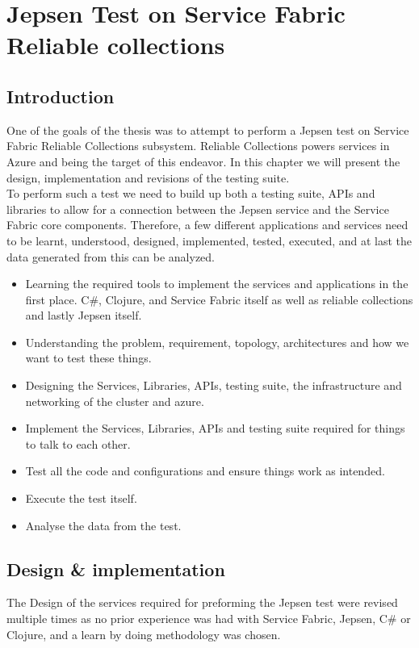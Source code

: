 \documentclass[a4paper,10pt,titlepage]{report}
\begin{document}
    \chapter{Jepsen Test on Service Fabric Reliable collections}


    \section{Introduction}

    One of the goals of the thesis was to attempt to perform a Jepsen test on Service Fabric Reliable Collections subsystem. Reliable Collections powers services in Azure and being the target of this endeavor. 
    In this chapter we will present the design, implementation and revisions of the testing suite. \\
    \vspace{5mm}
    To perform such a test we need to build up both a testing suite, APIs and libraries to allow for a connection between the Jepsen service and the Service Fabric core components. Therefore, a few different applications and services need to be learnt, understood, designed, implemented, tested, executed, and at last the data generated from this can be analyzed.
    \begin{itemize}
        \item Learning the required tools to implement the services and applications in the first place. C\#, Clojure, and Service Fabric itself as well as reliable collections and lastly Jepsen itself.
        \item Understanding the problem, requirement, topology, architectures and how we want to test these things.
        \item Designing the Services, Libraries, APIs, testing suite, the infrastructure and networking of the cluster and azure.
        \item Implement the Services, Libraries, APIs and testing suite required for things to talk to each other.
        \item Test all the code and configurations and ensure things work as intended.
        \item Execute the test itself.
        \item Analyse the data from the test.
    \end{itemize}

   
    \section{Design \& implementation}
    The Design of the services required for preforming the Jepsen test were revised multiple times as no prior experience was had with Service Fabric, Jepsen, C\# or Clojure, and a learn by doing methodology was chosen. 
\end{document}
